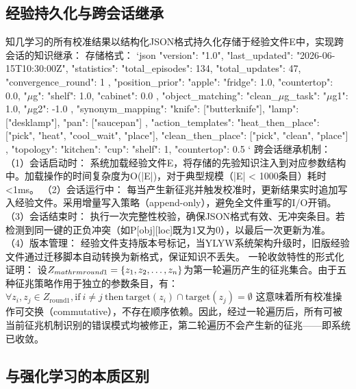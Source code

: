 \documentclass[12pt,a4paper]{article}
\begin{document}
\subsection{经验持久化与跨会话继承}
知几学习的所有校准结果以结构化JSON格式持久化存储于经验文件E中，实现跨会话的知识继承：
存储格式：
`json
{
"version": "1.0",
"last\_updated": "2026-06-15T10:30:00Z",
"statistics": {
"total\_episodes": 134,
"total\_updates": 47,
"convergence\_round": 1
},
"position\_prior": {
"apple": {"fridge": 1.0, "countertop": 0.0},
"$\mu$g": {"shelf": 1.0, "cabinet": 0.0}
},
"object\_matching": {
"clean\_$\mu$g\_task": {"$\mu$g1": 1.0, "$\mu$g2": -1.0}
},
"synonym\_mapping": {
"knife": ["butterknife"],
"lamp": ["desklamp"],
"pan": ["saucepan"]
},
"action\_templates": {
"heat\_then\_place": ["pick", "heat", "cool\_wait", "place"],
"clean\_then\_place": ["pick", "clean", "place"]
},
"topology": {
"kitchen": {"cup": {"shelf": 1, "countertop": 0.5}}
}
}
`
跨会话继承机制：
（1）会话启动时： 系统加载经验文件E，将存储的先验知识注入到对应参数结构中。加载操作的时间复杂度为O(|E|)，对于典型规模（|E| < 1000条目）耗时<1ms。
（2）会话运行中： 每当产生新征兆并触发校准时，更新结果实时追加写入经验文件。采用增量写入策略（append-only），避免全文件重写的I/O开销。
（3）会话结束时： 执行一次完整性校验，确保JSON格式有效、无冲突条目。若检测到同一键的正负冲突（如P[obj][loc]既为1又为0），以最后一次更新为准。
（4）版本管理： 经验文件支持版本号标记，当YLYW系统架构升级时，旧版经验文件通过迁移脚本自动转换为新格式，保证知识不丢失。
一轮收敛特性的形式化证明：
设$Z_{\\mathrm{round1}} = \{z_1, z_2, \dots, z_n\}$为第一轮遍历产生的征兆集合。由于五种征兆策略作用于独立的参数条目，有：
$\forall z_i, z_j \in Z_{\mathrm{round1}}, \mathrm{if}\ i \neq j\ \mathrm{then}\ \mathrm{target}(z_i) \cap \mathrm{target}(z_j) = \emptyset$
这意味着所有校准操作可交换（commutative），不存在顺序依赖。因此，经过一轮遍历后，所有可被当前征兆机制识别的错误模式均被修正，第二轮遍历不会产生新的征兆——即系统已收敛。

\subsection{与强化学习的本质区别}
\end{document}
